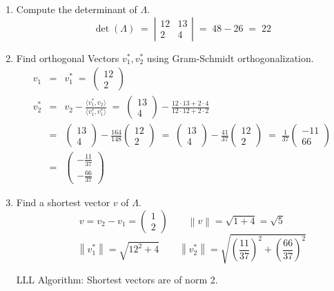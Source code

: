 \documentclass[a4paper]{scrreprt}
\newcommand{\norm}[1]{\left\lVert #1 \right\rVert}
\begin{document}
\begin{enumerate}[label=\alph*)]
    \item Compute the determinant of $\Lambda$.
    \[\det(\Lambda)\;=\;\left|\begin{matrix}12 & 13 \\ 2 & 4\end{matrix}\right|\;=\;48-26\;=\;22\]

    \item Find orthogonal Vectors $v_1^*, v_2^*$ using Gram-Schmidt orthogonalization.
        \begin{eqnarray*}
            v_1 &=& v_1^* \;=\; \begin{pmatrix}12\\2\end{pmatrix}\\[0.5em]
            v_2^* &=& v_2 - \frac{\langle v_1^*, v_2\rangle}{\langle v_1^*,v_1^*\rangle}
                \;=\; \begin{pmatrix}13\\4\end{pmatrix}-\frac{12\cdot13+2\cdot4}{12\cdot12+2\cdot2}\\
                &=& \begin{pmatrix}13\\4\end{pmatrix} - \frac{164}{148}\begin{pmatrix}12\\2\end{pmatrix}
                \;=\; \begin{pmatrix}13\\4\end{pmatrix} - \frac{41}{37}\begin{pmatrix}12\\2\end{pmatrix}
                \;=\; \frac{1}{37}\begin{pmatrix}-11\\66\end{pmatrix}\\[0.5em]
                &=&\begin{pmatrix}-\frac{11}{37}\\-\frac{66}{37}\end{pmatrix}
        \end{eqnarray*}

    \item Find a shortest vector $v$ of $\Lambda$.
    \[v=v_2-v_1=\begin{pmatrix}1\\2\end{pmatrix}
            \qquad \norm{v}=\sqrt{1+4}=\sqrt5\]
    \vspace*{-0.5em}
    \[\qquad \norm{v_1^*} = \sqrt{12^2+4}
        \qquad \norm{v_2^*} = \sqrt{\left(\frac{11}{37}\right)^2 + \left(\frac{66}{37}\right)^2}\]

    LLL Algorithm: Shortest vectors are of norm 2.
\end{enumerate}
\end{document}
